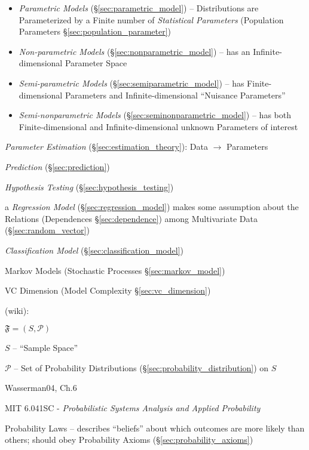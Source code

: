 \begin{itemize}
  \item \emph{Parametric Models} (\S\ref{sec:parametric_model}) -- Distributions
    are Parameterized by a Finite number of \emph{Statistical Parameters}
    (Population Parameters \S\ref{sec:population_parameter})
  \item \emph{Non-parametric Models} (\S\ref{sec:nonparametric_model})
    -- has an Infinite-dimensional Parameter Space
  \item \emph{Semi-parametric Models} (\S\ref{sec:semiparametric_model}) -- has
    Finite-dimensional Parameters and Infinite-dimensional
    ``Nuisance Parameters''
  \item \emph{Semi-nonparametric Models} (\S\ref{sec:seminonparametric_model})
    -- has both Finite-dimensional and Infinite-dimensional unknown Parameters
    of interest
\end{itemize}

\emph{Parameter Estimation} (\S\ref{sec:estimation_theory}): Data $\to$
Parameters

\emph{Prediction} (\S\ref{sec:prediction})

\emph{Hypothesis Testing} (\S\ref{sec:hypothesis_testing})

\fist a \emph{Regression Model} (\S\ref{sec:regression_model}) makes some
assumption about the Relations (Dependences \S\ref{sec:dependence}) among
Multivariate Data (\S\ref{sec:random_vector})

\fist \emph{Classification Model} (\S\ref{sec:classification_model})

\fist Markov Models (Stochastic Processes \S\ref{sec:markov_model})

VC Dimension (Model Complexity \S\ref{sec:vc_dimension})

(wiki):

$\mathfrak{F} = (S, \mathcal{P})$

$S$ -- ``Sample Space''

$\mathcal{P}$ -- Set of Probability Distributions
(\S\ref{sec:probability_distribution}) on $S$

Wasserman04, Ch.6

\asterism

MIT 6.041SC - \emph{Probabilistic Systems Analysis and Applied Probability}

Probability Laws -- describes ``beliefs'' about which outcomes are more likely
than others; should obey Probability Axioms (\S\ref{sec:probability_axioms})

